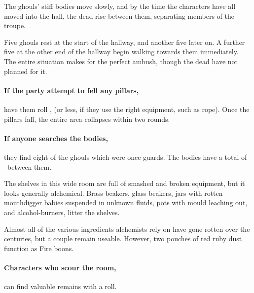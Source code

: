 The ghouls' stiff bodies move slowly, and by the time the characters have all moved into the hall, the dead rise between them, separating members of the troupe.

Five ghouls rest at the start of the hallway, and another five later on.
A further five at the other end of the hallway begin walking towards them immediately.
The entire situation makes for the perfect ambush, though the dead have not planned for it.

\paragraph{If the party attempt to fell any pillars,}
have them roll , \tn[13] (or less, if they use the right equipment, such as rope).
Once the pillars fall, the entire area collapses within two rounds.

\paragraph{If anyone searches the bodies,}
they find eight of the ghouls which were once \glspl{guard}.
The bodies have a total of \lootMedium\ between them.



\begin{boxtext}
  The shelves in this wide room are full of smashed and broken equipment, but it looks generally alchemical.
  Brass beakers, glass beakers, jars with rotten mouthdigger babies suspended in unknown fluids, pots with mould leaching out, and alcohol-burners, litter the shelves.
\end{boxtext}


Almost all of the various \glspl{ingredient} alchemists rely on have gone rotten over the centuries, but a couple remain useable.
However, two pouches of red ruby dust function as Fire \glspl{boon}.

\paragraph{Characters who scour the room,}
can find valuable remains with a  roll.

